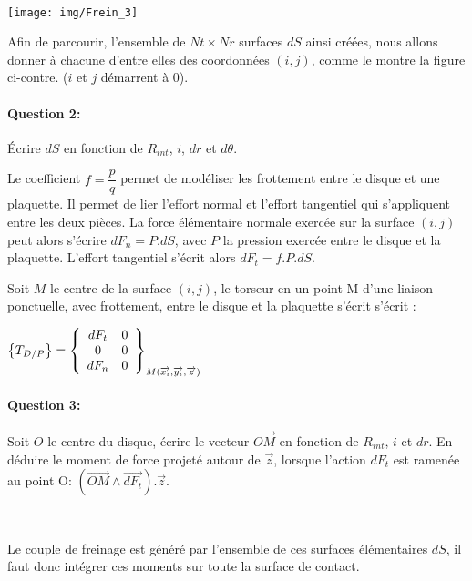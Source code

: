 ~\

\begin{minipage}{0.47\linewidth}
 \centering\texttt{[image: img/Frein\_3]}
\end{minipage}\hfill
\begin{minipage}{0.47\linewidth}
Afin de parcourir, l'ensemble de $Nt\times Nr$ surfaces $dS$ ainsi créées, nous allons donner à chacune d'entre elles des coordonnées $(i,j)$, comme le montre la figure ci-contre. ($i$ et $j$ démarrent à $0$).

\paragraph{Question 2:} Écrire $dS$ en fonction de $R_{int}$, $i$, $dr$ et $d\theta$.
\end{minipage}

Le coefficient $f=\dfrac{p}{q}$ permet de modéliser les frottement entre le disque et une plaquette. Il permet de lier l'effort normal et l'effort tangentiel qui s'appliquent entre les deux pièces. La force élémentaire normale exercée sur la surface $(i,j)$ peut alors s'écrire $dF_n=P.dS$, avec $P$ la pression exercée entre le disque et la plaquette. L'effort tangentiel s'écrit alors $dF_t=f.P.dS$.

Soit $M$ le centre de la surface $(i,j)$, le torseur en un point M d'une liaison ponctuelle, avec frottement, entre le disque et la plaquette s'écrit s'écrit :

$\left\{T_{D/P}\right\}=\left\{\begin{array}{c c}
dF_t & 0 \\ 0 & 0 \\ dF_n & 0
\end{array}\right\}_{M(\overrightarrow{x_i},\overrightarrow{y_i},\overrightarrow{z})}$

\paragraph{Question 3:} Soit $O$ le centre du disque, écrire le vecteur $\overrightarrow{OM}$ en fonction de $R_{int}$, $i$ et $dr$. En déduire le moment de force projeté autour de $\overrightarrow{z}$, lorsque l'action $dF_t$ est ramenée au point O: $(\overrightarrow{OM}\wedge \overrightarrow{dF_t}).\overrightarrow{z}$.

~\

Le couple de freinage est généré par l'ensemble de ces surfaces élémentaires $dS$, il faut donc intégrer ces moments sur toute la surface de contact.

